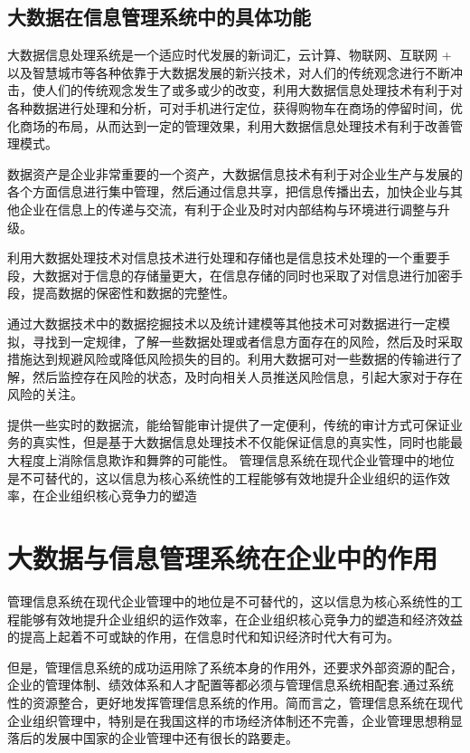 \documentclass[a4paper,UTF8,cs4size]{ctexart}
\begin{document}
	\subsection{大数据在信息管理系统中的具体功能}
	大数据信息处理系统是一个适应时代发展的新词汇，云计算、物联网、互联网 + 以及智慧城市等各种依靠于大数据发展的新兴技术，对人们的传统观念进行不断冲击，使人们的传统观念发生了或多或少的改变，利用大数据信息处理技术有利于对各种数据进行处理和分析，可对手机进行定位，获得购物车在商场的停留时间，优化商场的布局，从而达到一定的管理效果，利用大数据信息处理技术有利于改善管理模式。\par
	数据资产是企业非常重要的一个资产，大数据信息技术有利于对企业生产与发展的各个方面信息进行集中管理，然后通过信息共享，把信息传播出去，加快企业与其他企业在信息上的传递与交流，有利于企业及时对内部结构与环境进行调整与升级。\par
	利用大数据处理技术对信息技术进行处理和存储也是信息技术处理的一个重要手段，大数据对于信息的存储量更大，在信息存储的同时也采取了对信息进行加密手段，提高数据的保密性和数据的完整性。\par
	通过大数据技术中的数据挖掘技术以及统计建模等其他技术可对数据进行一定模拟，寻找到一定规律，了解一些数据处理或者信息方面存在的风险，然后及时采取措施达到规避风险或降低风险损失的目的。利用大数据可对一些数据的传输进行了解，然后监控存在风险的状态，及时向相关人员推送风险信息，引起大家对于存在风险的关注。\par
	提供一些实时的数据流，能给智能审计提供了一定便利，传统的审计方式可保证业务的真实性，但是基于大数据信息处理技术不仅能保证信息的真实性，同时也能最大程度上消除信息欺诈和舞弊的可能性。
	管理信息系统在现代企业管理中的地位是不可替代的，这以信息为核心系统性的工程能够有效地提升企业组织的运作效率，在企业组织核心竞争力的塑造\par
	\section{大数据与信息管理系统在企业中的作用}
	管理信息系统在现代企业管理中的地位是不可替代的，这以信息为核心系统性的工程能够有效地提升企业组织的运作效率，在企业组织核心竞争力的塑造和经济效益的提高上起着不可或缺的作用，在信息时代和知识经济时代大有可为。\par
	但是，管理信息系统的成功运用除了系统本身的作用外，还要求外部资源的配合，企业的管理体制、绩效体系和人才配置等都必须与管理信息系统相配套.通过系统性的资源整合，更好地发挥管理信息系统的作用。简而言之，管理信息系统在现代企业组织管理中，特别是在我国这样的市场经济体制还不完善，企业管理思想稍显落后的发展中国家的企业管理中还有很长的路要走。\cite{q3} \par
	
	\begin{thebibliography}{99}
		\songti{}
		\songti{}
		\songti{}
		\songti{}
	\end{thebibliography}
\end{document}

